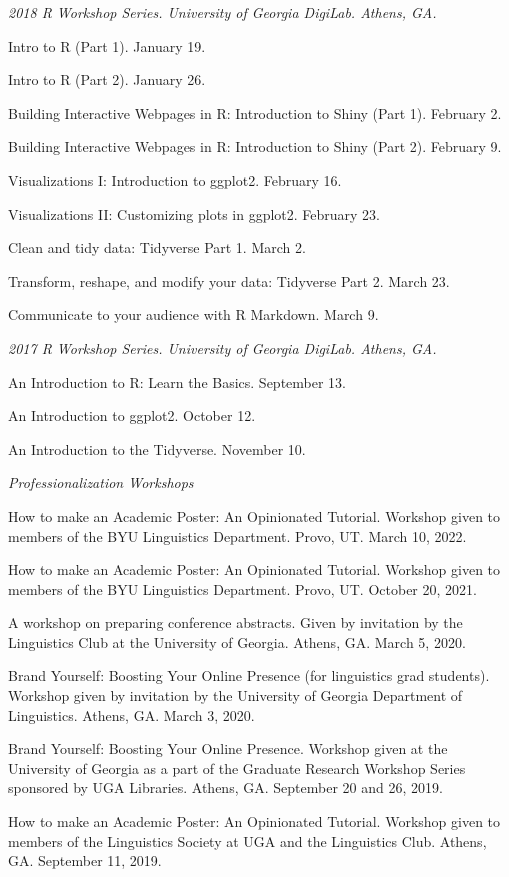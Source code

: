 \documentclass[
]{article}
\begin{document}
\emph{2018 R Workshop Series. University of Georgia DigiLab. Athens,
GA.}

Intro to R (Part 1). January 19.

Intro to R (Part 2). January 26.

Building Interactive Webpages in R: Introduction to Shiny (Part 1).
February 2.

Building Interactive Webpages in R: Introduction to Shiny (Part 2).
February 9.

Visualizations I: Introduction to ggplot2. February 16.

Visualizations II: Customizing plots in ggplot2. February 23.

Clean and tidy data: Tidyverse Part 1. March 2.

Transform, reshape, and modify your data: Tidyverse Part 2. March 23.

Communicate to your audience with R Markdown. March 9.

\emph{2017 R Workshop Series. University of Georgia DigiLab. Athens,
GA.}

An Introduction to R: Learn the Basics. September 13.

An Introduction to ggplot2. October 12.

An Introduction to the Tidyverse. November 10.

\emph{Professionalization Workshops}

How to make an Academic Poster: An Opinionated Tutorial. Workshop given
to members of the BYU Linguistics Department. Provo, UT. March 10, 2022.

How to make an Academic Poster: An Opinionated Tutorial. Workshop given
to members of the BYU Linguistics Department. Provo, UT. October 20,
2021.

A workshop on preparing conference abstracts. Given by invitation by the
Linguistics Club at the University of Georgia. Athens, GA. March 5,
2020.

Brand Yourself: Boosting Your Online Presence (for linguistics grad
students). Workshop given by invitation by the University of Georgia
Department of Linguistics. Athens, GA. March 3, 2020.

Brand Yourself: Boosting Your Online Presence. Workshop given at the
University of Georgia as a part of the Graduate Research Workshop Series
sponsored by UGA Libraries. Athens, GA. September 20 and 26, 2019.

How to make an Academic Poster: An Opinionated Tutorial. Workshop given
to members of the Linguistics Society at UGA and the Linguistics Club.
Athens, GA. September 11, 2019.
\end{document}
